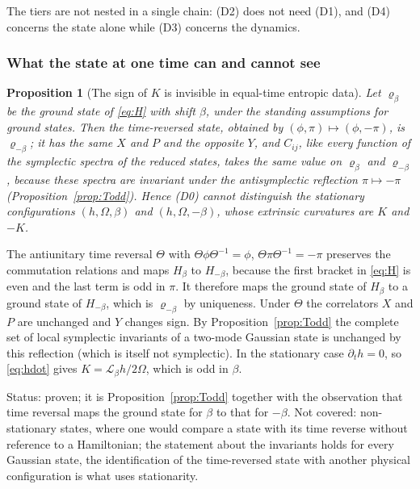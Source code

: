 \documentclass[11pt,a4paper]{article}
\makeatletter
\theoremstyle{stmt}
\newtheorem{proposition}[theorem]{Proposition}
\theoremstyle{defn}
\theoremstyle{rmk}
\renewenvironment{proof}[1][\proofname]{\par\pushQED{\qed}\normalfont\topsep6\p@\@plus6\p@\relax
  \trivlist\item[\hskip\labelsep{\sffamily\itshape\small #1.}]\ignorespaces}{\popQED\endtrivlist\@endpefalse}
\numberwithin{equation}{section}
\newcommand{\Lie}{\mathcal{L}}
\newcommand{\status}[1]{\par\noindent\textsf{\small Status: #1}\par}
\makeatother
\begin{document}
{The tiers are not nested in a single chain: (D2) does not need (D1), and (D4) concerns the state alone while (D3) concerns the dynamics.

\subsubsection{What the state at one time can and cannot see}

\begin{proposition}[The sign of $K$ is invisible in equal-time entropic data]\label{prop:sign}
Let $\varrho_\beta$ be the ground state of \eqref{eq:H} with shift $\beta$, under the standing assumptions for ground states. Then the time-reversed state, obtained by $(\phi,\pi)\mapsto(\phi,-\pi)$, is $\varrho_{-\beta}$; it has the same $X$ and $P$ and the opposite $Y$, and $C_{ij}$, like every function of the symplectic spectra of the reduced states, takes the same value on $\varrho_\beta$ and $\varrho_{-\beta}$, because these spectra are invariant under the antisymplectic reflection $\pi\mapsto-\pi$ (Proposition~\ref{prop:Todd}). Hence \textup{(D0)} cannot distinguish the stationary configurations $(h,\Omega,\beta)$ and $(h,\Omega,-\beta)$, whose extrinsic curvatures are $K$ and $-K$.
\end{proposition}

\begin{proof}
The antiunitary time reversal $\Theta$ with $\Theta\phi\Theta^{-1}=\phi$, $\Theta\pi\Theta^{-1}=-\pi$ preserves the commutation relations and maps $H_\beta$ to $H_{-\beta}$, because the first bracket in \eqref{eq:H} is even and the last term is odd in $\pi$. It therefore maps the ground state of $H_\beta$ to a ground state of $H_{-\beta}$, which is $\varrho_{-\beta}$ by uniqueness. Under $\Theta$ the correlators $X$ and $P$ are unchanged and $Y$ changes sign. By Proposition~\ref{prop:Todd} the complete set of local symplectic invariants of a two-mode Gaussian state is unchanged by this reflection (which is itself not symplectic). In the stationary case $\partial_th=0$, so \eqref{eq:hdot} gives $K=\Lie_\beta h/2\Omega$, which is odd in $\beta$.
\end{proof}
\status{proven; it is Proposition~\ref{prop:Todd} together with the observation that time reversal maps the ground state for $\beta$ to that for $-\beta$. Not covered: non-stationary states, where one would compare a state with its time reverse without reference to a Hamiltonian; the statement about the invariants holds for every Gaussian state, the identification of the time-reversed state with another physical configuration is what uses stationarity.}

}
\end{document}
